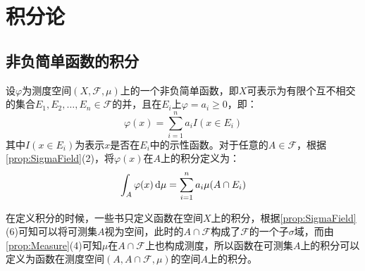 \section{积分论}

\subsection{非负简单函数的积分}
\begin{definition}
	设$\varphi$为测度空间$(X,\mathscr{F},\mu)$上的一个非负简单函数，即$X$可表示为有限个互不相交的集合$E_1,E_2,\dots,E_n\in\mathscr{F}$的并，且在$E_i$上$\varphi=a_i\geqslant0$，即：
	\begin{equation*}
		\varphi(x)=\sum_{i=1}^{n}a_iI(x\in E_i)
	\end{equation*}
	其中$I(x\in E_i)$为表示$x$是否在$E_i$中的示性函数。对于任意的$A\in\mathscr{F}$，根据\cref{prop:SigmaField}(2)，将$\varphi(x)$在$A$上的积分定义为：
	\begin{equation*}
		\int_{A}\varphi(x)\mathop{}\!\mathrm{d}\mu=\sum_{i=1}^{n}a_i\mu(A\cap E_i)
	\end{equation*}
\end{definition}
\begin{note}
	在定义积分的时候，一些书只定义函数在空间$X$上的积分，根据\cref{prop:SigmaField}(6)可知可以将可测集$A$视为空间，此时的$A\cap\mathscr{F}$构成了$\mathscr{F}$的一个子$\sigma$域，而由\cref{prop:Measure}(4)可知$\mu$在$A\cap\mathscr{F}$上也构成测度，所以函数在可测集$A$上的积分可以定义为函数在测度空间$(A,A\cap\mathscr{F},\mu)$的空间$A$上的积分。
\end{note}
